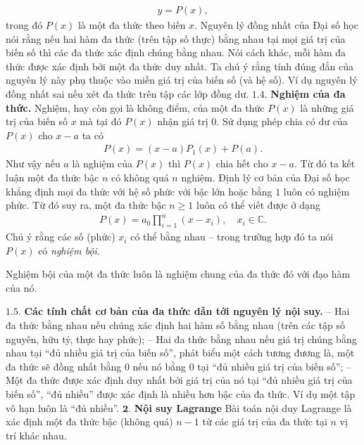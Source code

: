 \begin{multicols}{2}
	\begin{align*}
		y=P(x),
	\end{align*}
	trong đó $P(x)$ là một đa thức theo biến $x$.
	\vskip 0.1cm
	{Nguyên lý đồng nhất của Đại số học} nói rằng nếu hai hàm đa thức (trên tập số thực) bằng nhau tại mọi giá trị của biến số thì các đa thức xác định chúng bằng nhau. Nói cách khác, mỗi hàm đa thức được xác định bởi một đa thức duy nhất. 
	\vskip 0.1cm
	Ta chú ý rằng tính đúng đắn của nguyên lý này phụ thuộc vào miền giá trị của biến số (và hệ số). Ví dụ nguyên lý đồng nhất sai nếu xét đa thức trên tập các lớp đồng dư. 
	\vskip 0.1cm	
	$\pmb{1.4.}$ \textbf{\color{hoccungpi}Nghiệm của đa thức.}
	Nghiệm, hay còn gọi là không điểm, của một đa thức $P(x)$ là những giá trị của biến số $x$ mà tại đó $P(x)$ nhận giá trị $0$. Sử dụng phép chia có dư của $P(x)$ cho $x-a$ ta có
	\begin{align*}
		P(x)=(x-a)P_1(x)+P(a).
	\end{align*}
	Như vậy nếu $a$ là nghiệm của $P(x)$ thì $P(x)$ chia hết cho $x-a$. Từ đó ta kết luận một đa thức bậc $n$ { có không quá $n$ nghiệm}.
	\vskip 0.1cm
	{ Định lý cơ bản của Đại số học} khẳng định mọi đa thức với hệ số phức với bậc lớn hoặc bằng $1$ luôn có nghiệm phức. 
	Từ đó suy ra, một đa thức bậc $n\geq 1$ luôn có thể viết được ở dạng
	\begin{align*}
		P(x)=a_0\prod_{i=1}^n(x-x_i), \quad x_i\in\mathbb C.
	\end{align*}
	Chú ý rằng các số (phức) $x_i$ có thể bằng nhau -- trong trường hợp đó ta nói $P(x)$ có {\em nghiệm bội}.
	\begin{tBox}
		Nghiệm bội của một đa thức luôn là nghiệm chung của đa thức đó với đạo hàm của nó. 
	\end{tBox}
	$\pmb{1.5.}$ \textbf{\color{hoccungpi}Các tính chất cơ bản của đa thức dẫn tới nguyên lý nội suy.}
	\vskip 0.1cm
	-- Hai đa thức bằng nhau nếu chúng xác định hai hàm số  bằng nhau (trên các tập số nguyên, hữu tỷ, thực hay phức);
	\vskip 0.1cm
	-- Hai đa thức bằng nhau nếu giá trị chúng bằng nhau tại ``đủ nhiều giá trị của biến số'', phát biểu một cách tương đương là, một đa thức sẽ đồng nhất bằng $0$ nếu nó bằng $0$ tại ``đủ nhiều giá trị của biến số'';
	\vskip 0.1cm
	-- Một đa thức được xác định duy nhất bởi giá trị của nó tại ``đủ nhiều giá trị của biến số'', ``đủ nhiều'' được xác định là nhiều hơn bậc của đa thức. Ví dụ một tập vô hạn luôn là ``đủ nhiều''.
	\vskip 0.1cm
	$\pmb{2.}$ \textbf{\color{hoccungpi}Nội suy Lagrange}
	\vskip 0.1cm
	Bài toán nội duy Lagrange là xác định một đa thức bậc (không quá) $n-1$ từ các giá trị của đa thức tại $n$ vị trí khác nhau.

\end{multicols}
